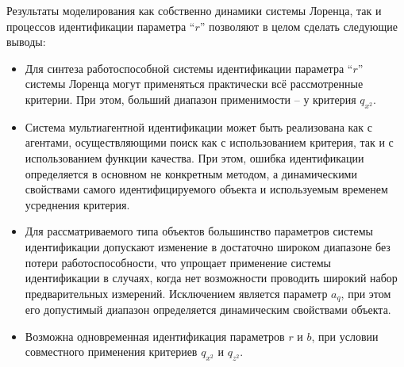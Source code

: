 Результаты моделирования как собственно динамики
системы Лоренца,
так и процессов идентификации параметра ``$r$''
позволяют в целом сделать следующие выводы:

\begin{itemize}

  \item
    Для синтеза работоспособной системы идентификации параметра  ``$r$''
    системы Лоренца могут применяться практически всё рассмотренные критерии.
    При этом, больший диапазон применимости -- у критерия $q_{x^2}$.

  \item
    Система мультиагентной идентификации может быть
    реализована как с агентами, осуществляющими поиск
    как с использованием критерия, так и с использованием
    функции качества. При этом, ошибка идентификации
    определяется в основном не конкретным методом,
    а динамическими свойствами самого идентифицируемого
    объекта и используемым временем усреднения критерия.

  \item
    Для рассматриваемого типа объектов большинство параметров
    системы идентификации допускают изменение в достаточно
    широком диапазоне без потери работоспособности,
    что упрощает применение системы идентификации
    в случаях, когда нет возможности проводить
    широкий набор предварительных измерений.
    Исключением является параметр $a_q$, при этом его допустимый диапазон
    определяется динамическим свойствами объекта.

  \item
    Возможна одновременная идентификация параметров $r$ и $b$,
    при условии совместного применения критериев $q_{x^2}$ и $q_{z^2}$.

\end{itemize}





